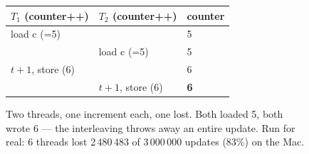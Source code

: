 \begin{figure}[htbp]
\centering
\begin{tabular}{lll}
\toprule
$T_1$ (counter++) & $T_2$ (counter++) & counter \\
\midrule
load c (=5)  &              & 5 \\
             & load c (=5)  & 5 \\
$t{+}1$, store (6) &      & 6 \\
             & $t{+}1$, store (6) & \textbf{6} \\
\bottomrule
\end{tabular}
\caption{Two threads, one increment each, one lost. Both loaded 5,
both wrote 6 --- the interleaving throws away an entire update.
Run for real: 6 threads lost 2\,480\,483 of 3\,000\,000 updates
(83\%) on the Mac.}
\label{fig:racetime13}
\end{figure}
